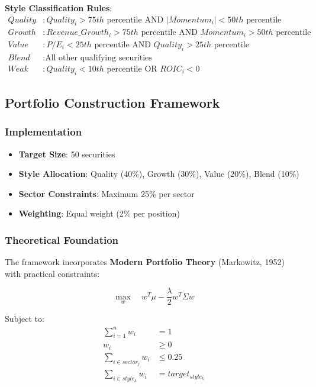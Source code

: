 \documentclass[12pt,a4paper]{article}
\begin{document}
\textbf{Style Classification Rules}:
\begin{align}
Quality &: Quality_i > 75th \text{ percentile AND } |Momentum_i| < 50th \text{ percentile} \\
Growth &: Revenue\_Growth_i > 75th \text{ percentile AND } Momentum_i > 50th \text{ percentile} \\
Value &: P/E_i < 25th \text{ percentile AND } Quality_i > 25th \text{ percentile} \\
Blend &: \text{All other qualifying securities} \\
Weak &: Quality_i < 10th \text{ percentile OR } ROIC_i < 0
\end{align}

\subsection{Portfolio Construction Framework}

\subsubsection{Implementation}
\begin{itemize}
    \item \textbf{Target Size}: 50 securities
    \item \textbf{Style Allocation}: Quality (40\%), Growth (30\%), Value (20\%), Blend (10\%)
    \item \textbf{Sector Constraints}: Maximum 25\% per sector
    \item \textbf{Weighting}: Equal weight (2\% per position)
\end{itemize}

\subsubsection{Theoretical Foundation}
The framework incorporates \textbf{Modern Portfolio Theory} (Markowitz, 1952) with practical constraints:

\begin{equation}
\max_w \quad w^T\mu - \frac{\lambda}{2}w^T\Sigma w
\end{equation}

Subject to:
\begin{align}
\sum_{i=1}^n w_i &= 1 \\
w_i &\geq 0 \\
\sum_{i \in sector_j} w_i &\leq 0.25 \\
\sum_{i \in style_k} w_i &= target_{style_k}
\end{align}
\end{document}

